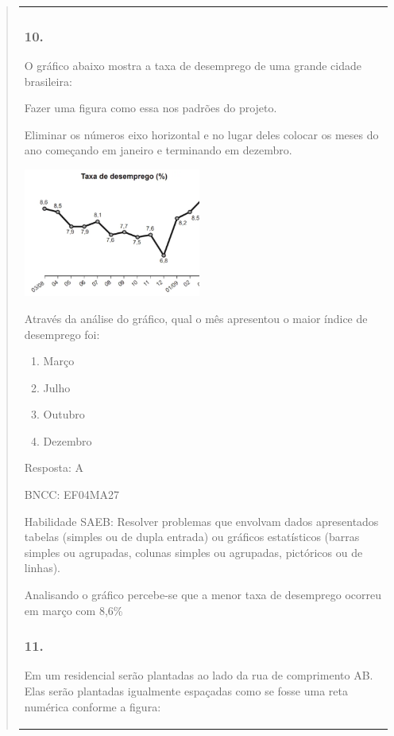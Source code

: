 \begin{enumerate}
\begin{escolha}
\begin{enumerate}
\begin{itemize}
\begin{itemize}
\begin{escolha}
\begin{quote}
\begin{escolha}
{\begin{longtable}[]{@{}l@{}}
\begin{itemize}
\subsubsection{10.}\label{section-151}

O gráfico abaixo mostra a taxa de desemprego de uma grande cidade
brasileira:

Fazer uma figura como essa nos padrões do projeto.

Eliminar os números eixo horizontal e no lugar deles colocar os meses do
ano começando em janeiro e terminando em dezembro.

\includegraphics[width=2.29697in,height=1.66026in]{media/image146.png}

Através da análise do gráfico, qual o mês apresentou o maior índice de
desemprego foi:

\begin{enumerate}
\def\labelenumi{\alph{enumi})}
\item
  Março
\item
  Julho
\item
  Outubro
\item
  Dezembro
\end{enumerate}

Resposta: A

BNCC: EF04MA27

Habilidade SAEB: Resolver problemas que envolvam dados apresentados
tabelas (simples ou de dupla entrada) ou gráficos estatísticos (barras
simples ou agrupadas, colunas simples ou agrupadas, pictóricos ou de
linhas).

Analisando o gráfico percebe-se que a menor taxa de desemprego ocorreu
em março com 8,6\%

\subsubsection{11.}\label{section-152}

Em um residencial serão plantadas ao lado da rua de comprimento AB. Elas
serão plantadas igualmente espaçadas como se fosse uma reta numérica
conforme a figura:


\end{itemize}
\end{longtable}}
\end{escolha}
\end{quote}
\end{escolha}
\end{itemize}
\end{itemize}
\end{enumerate}
\end{escolha}
\end{enumerate}
